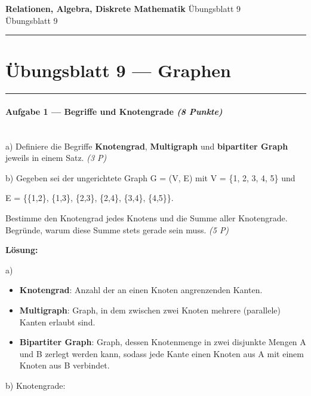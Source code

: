 \documentclass[11pt, a4paper]{article}
\providecommand{\nichttitle}{Übungsblatt}
\providecommand{\nichtsubtitle}{}
\renewcommand{\nichttitle}{Relationen, Algebra, Diskrete Mathematik}
\renewcommand{\nichtsubtitle}{Übungsblatt 9}
\begin{document}
\begin{center}
{\Large\bfseries\color{accent}\nichttitle}
\ifx\nichtsubtitle\empty\else
  \\[2pt]{\normalsize\color{accent!80!black}\nichtsubtitle}
\fi
\\[2pt]
\color{accent}\rule{0.4\linewidth}{0.8pt}\color{black}
\end{center}
\vspace{4pt}


\section{Übungsblatt 9 — Graphen}


\noindent\textcolor{rulegray}{\rule{\linewidth}{0.4pt}}


\paragraph{Aufgabe 1 — Begriffe und Knotengrade \textit{(8 Punkte)}}\mbox{}\\[2pt]

a) Definiere die Begriffe \textbf{Knotengrad}, \textbf{Multigraph} und \textbf{bipartiter Graph} jeweils in einem Satz. \textit{(3 P)}


b) Gegeben sei der ungerichtete Graph G = (V, E) mit V = \{1, 2, 3, 4, 5\} und

E = \{\{1,2\}, \{1,3\}, \{2,3\}, \{2,4\}, \{3,4\}, \{4,5\}\}.

Bestimme den Knotengrad jedes Knotens und die Summe aller Knotengrade. Begründe, warum diese Summe stets gerade sein muss. \textit{(5 P)}


\textbf{Lösung:}


a)

\begin{itemize}
  \item \textbf{Knotengrad}: Anzahl der an einen Knoten angrenzenden Kanten.
  \item \textbf{Multigraph}: Graph, in dem zwischen zwei Knoten mehrere (parallele) Kanten erlaubt sind.
  \item \textbf{Bipartiter Graph}: Graph, dessen Knotenmenge in zwei disjunkte Mengen A und B zerlegt werden kann, sodass jede Kante einen Knoten aus A mit einem Knoten aus B verbindet.
\end{itemize}

b) Knotengrade:
\end{document}
